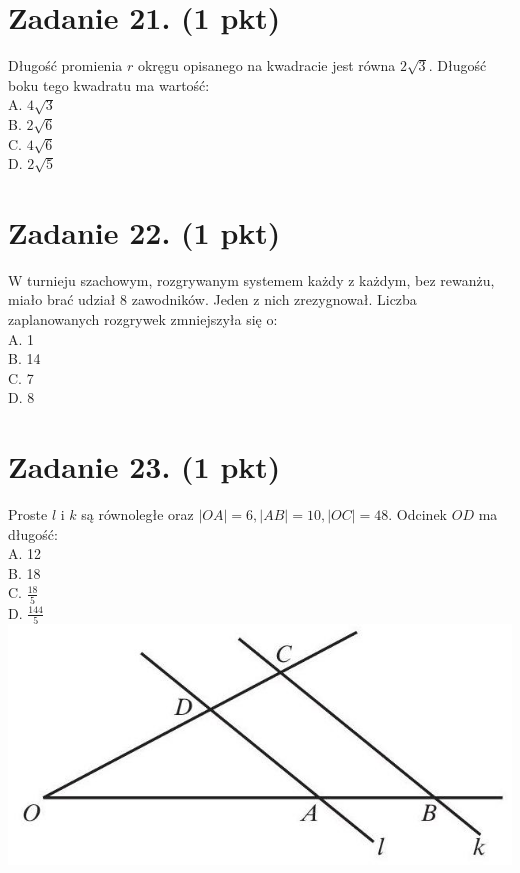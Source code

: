 \documentclass[10pt]{article}
\begin{document}
\section*{Zadanie 21. (1 pkt)}
Długość promienia \(r\) okręgu opisanego na kwadracie jest równa \(2 \sqrt{3}\). Długość boku tego kwadratu ma wartość:\\
A. \(4 \sqrt{3}\)\\
B. \(2 \sqrt{6}\)\\
C. \(4 \sqrt{6}\)\\
D. \(2 \sqrt{5}\)

\section*{Zadanie 22. (1 pkt)}
W turnieju szachowym, rozgrywanym systemem każdy z każdym, bez rewanżu, miało brać udział 8 zawodników. Jeden z nich zrezygnował. Liczba zaplanowanych rozgrywek zmniejszyła się o:\\
A. 1\\
B. 14\\
C. 7\\
D. 8

\section*{Zadanie 23. (1 pkt)}
Proste \(l\) i \(k\) są równoległe oraz \(|O A|=6,|A B|=10,|O C|=48\). Odcinek \(O D\) ma długość:\\
A. 12\\
B. 18\\
C. \(\frac{18}{5}\)\\
D. \(\frac{144}{5}\)\\
\includegraphics[max width=\textwidth, center]{2024_11_21_a38d702bc7be8115942cg-06}
\end{document}
